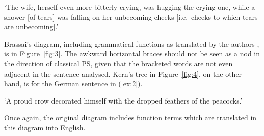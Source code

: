 \documentclass[output=paper,biblatex,babelshorthands,newtxmath,draftmode,colorlinks,citecolor=brown]{langscibook}
\begin{document}
\ea
\label{ex:1}
	\glt `The wife, herself even more bitterly crying, was hugging the crying one, while a shower [of tears] was falling on her unbecoming cheeks [i.e.\ cheeks to which tears are unbecoming].'
\z

Brassai's diagram, including grammatical functions as translated by the authors
\citep{ImrenyiVladar2020a-u}, is in Figure~\ref{fig:3}. The awkward horizontal braces should not be seen
as a nod in the direction of classical PS, given that the bracketed words are not even adjacent in
the sentence analysed. Kern's tree in Figure~\ref{fig:4}, on the other hand, is for the German
sentence in (\ref{ex:2}).

\ea
\label{ex:2}

\glt `A proud crow decorated himself with the dropped feathers of the peacocks.'
\z

Once again, the original diagram includes function terms which are translated in this diagram into English.
\end{document}
